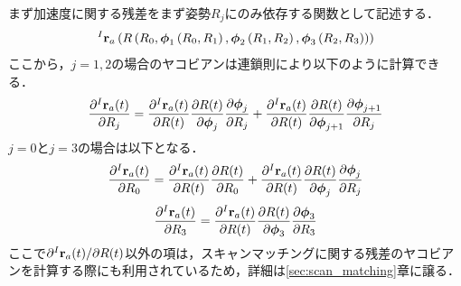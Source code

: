 まず加速度に関する残差をまず姿勢$R_{j}$にのみ依存する関数として記述する．
%
\begin{align}
  {}^{I}{\bf r}_{a}
  \left(
    R
    \left(
      R_{0},
      \boldsymbol \phi_{1} \left( R_{0}, R_{1} \right),
      \boldsymbol \phi_{2} \left( R_{1}, R_{2} \right),
      \boldsymbol \phi_{3} \left( R_{2}, R_{3} \right)
    \right)
  \right)
\end{align}
%
ここから，$j=1,2$の場合のヤコビアンは連鎖則により以下のように計算できる．
%
\begin{align}
  \frac{ \partial {}^{I}{\bf r}_{a}(t) }{ \partial R_{j} }
  =
  \frac{ \partial {}^{I}{\bf r}_{a}(t) }{ \partial R(t) }  
  \frac{ \partial R(t) }{ \partial \boldsymbol \phi_{j} }  
  \frac{ \partial \boldsymbol \phi_{j} }{ \partial R_{j} }  
  +
  \frac{ \partial {}^{I}{\bf r}_{a}(t) }{ \partial R(t) }  
  \frac{ \partial R(t) }{ \partial \boldsymbol \phi_{j+1} }  
  \frac{ \partial \boldsymbol \phi_{j+1} }{ \partial R_{j} }  
\end{align}
%
$j=0$と$j=3$の場合は以下となる．
%
\begin{align}
  \frac{ \partial {}^{I}{\bf r}_{a}(t) }{ \partial R_{0} }
  =
  \frac{ \partial {}^{I}{\bf r}_{a}(t) }{ \partial R(t) }  
  \frac{ \partial R(t) }{ \partial R_{0} }  
  +
  \frac{ \partial {}^{I}{\bf r}_{a}(t) }{ \partial R(t) }  
  \frac{ \partial R(t) }{ \partial \boldsymbol \phi_{j} }  
  \frac{ \partial \boldsymbol \phi_{j} }{ \partial R_{j} }  
\end{align}
%
\begin{align}
  \frac{ \partial {}^{I}{\bf r}_{a}(t) }{ \partial R_{3} }
  =
  \frac{ \partial {}^{I}{\bf r}_{a}(t) }{ \partial R(t) }  
  \frac{ \partial R(t) }{ \partial \boldsymbol \phi_{3} }  
  \frac{ \partial \boldsymbol \phi_{3} }{ \partial R_{3} }  
\end{align}
%
ここで$\partial {}^{I}{\bf r}_{a}(t) / \partial R(t)$以外の項は，スキャンマッチングに関する残差のヤコビアンを計算する際にも利用されているため，詳細は\ref{sec:scan_matching}章に譲る．


